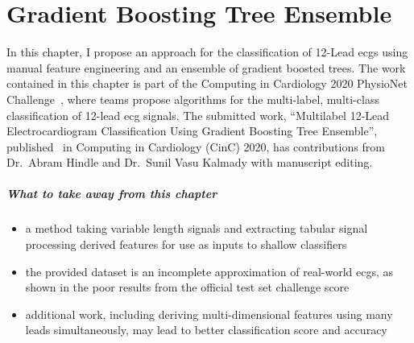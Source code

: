 \documentclass[\main/thesis.tex]{subfiles}
\begin{document}
\chapter{Gradient Boosting Tree Ensemble}
\label{chp:xgbensemble}

In this chapter, I propose an approach for the classification of 12-Lead \gls{ecg}s using manual feature engineering and an ensemble of gradient boosted trees.
The work contained in this chapter is part of the Computing in Cardiology 2020 PhysioNet Challenge~\cite{physionet_challenge_2020}, where teams propose algorithms for the multi-label, multi-class classification of 12-lead \gls{ecg} signals.
The submitted work, ``Multilabel 12-Lead Electrocardiogram Classification Using Gradient Boosting Tree Ensemble'', published~\cite{wong2020CINC-multilabel-ECG} in Computing in Cardiology (CinC) 2020, has contributions from Dr.\ Abram Hindle and Dr.\ Sunil Vasu Kalmady with manuscript editing.

\paragraph{What to take away from this chapter}
\begin{itemize}
    \item a method taking variable length signals and extracting tabular signal processing derived features for use as inputs to shallow classifiers
    \item the provided dataset is an incomplete approximation of real-world \gls{ecg}s, as shown in the poor results from the official test set challenge score
    \item additional work, including deriving multi-dimensional features using many leads simultaneously, may lead to better classification score and accuracy
\end{itemize}


\newcommand{\officialvalscore}{{0.476} }
\newcommand{\officialtestscore}{{-0.080} }
\end{document}
